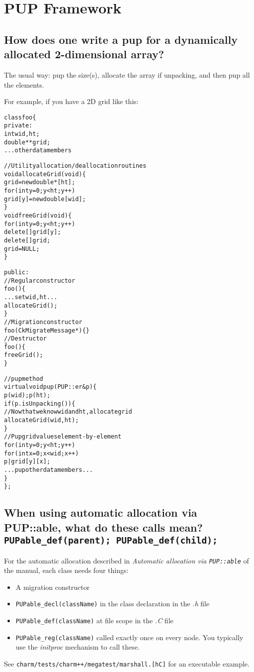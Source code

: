 \section{PUP Framework}

\subsection{How does one write a pup for a dynamically allocated 2-dimensional array?}

The usual way: pup the size(s), allocate the array if unpacking, and
then pup all the elements.

For example, if you have a 2D grid like this:
\begin{alltt}
class foo \{
 private:
  int wid,ht;
  double **grid;
  ...other data members

  //Utility allocation/deallocation routines
  void allocateGrid(void) \{
    grid=new double*[ht];
    for (int y=0;y<ht;y++)
      grid[y]=new double[wid];
  \}
  void freeGrid(void) \{
    for (int y=0;y<ht;y++)
      delete[] grid[y];
    delete[] grid;
    grid=NULL;
  \}

 public:
  //Regular constructor
  foo() \{
    ...set wid, ht...
    allocateGrid();
  \}
  //Migration constructor
  foo(CkMigrateMessage *) \{\}
  //Destructor
  \~foo() \{
    freeGrid();
  \}

  //pup method
  virtual void pup(PUP::er \&p) \{
    p(wid); p(ht);
    if (p.isUnpacking()) \{
      //Now that we know wid and ht, allocate grid
      allocateGrid(wid,ht);
    \}
    //Pup grid values element-by-element
    for (int y=0;y<ht;y++)
      for (int x=0; x<wid; x++)
        p|grid[y][x];
    ...pup other data members...
  \}
\};
\end{alltt}

\subsection{When using automatic allocation via PUP::able, what do these calls mean?
{\tt PUPable\_def(parent); PUPable\_def(child);}}

For the automatic allocation described in {\em Automatic allocation via
{\tt PUP::able}} of the manual, each class needs four things:
\begin{itemize}
\item A migration constructor

\item
{\tt PUPable\_decl(className)} in the class declaration in the {\em .h}
file

\item
{\tt PUPable\_def(className)} at file scope in the {\em .C} file

\item
{\tt PUPable\_reg(className)} called exactly once on every node. You
typically use the {\em initproc} mechanism to call these.
\end{itemize}
See {\tt charm/tests/charm++/megatest/marshall.[hC]} for an executable
example.

